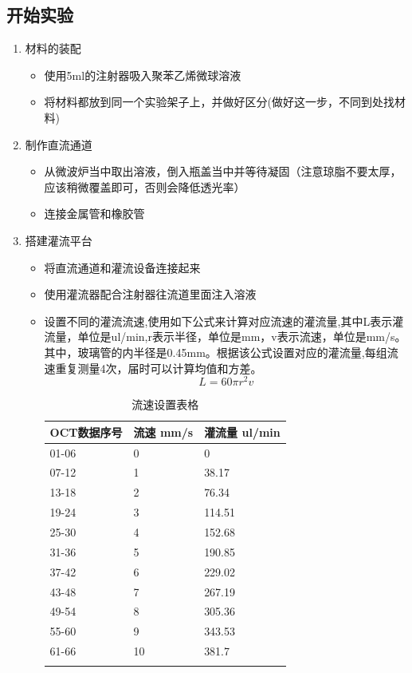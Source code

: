 \documentclass[12pt]{article}
\begin{document}
\subsection{开始实验}
\begin{enumerate}
    \item 材料的装配
    \begin{itemize}
        \item 使用5ml的注射器吸入聚苯乙烯微球溶液
        \item 将材料都放到同一个实验架子上，并做好区分(做好这一步，不同到处找材料)
    \end{itemize}

    \item 制作直流通道
    \begin{itemize}
        \item 从微波炉当中取出溶液，倒入瓶盖当中并等待凝固（注意琼脂不要太厚，应该稍微覆盖即可，否则会降低透光率）
        \item 连接金属管和橡胶管
    \end{itemize}

    \item 搭建灌流平台
    \begin{itemize}
        \item 将直流通道和灌流设备连接起来
        \item 使用灌流器配合注射器往流道里面注入溶液
        \item 设置不同的灌流流速,使用如下公式来计算对应流速的灌流量,其中L表示灌流量，单位是ul/min,r表示半径，单位是mm，v表示流速，单位是mm/s。其中，玻璃管的内半径是0.45mm。根据该公式设置对应的灌流量,每组流速重复测量4次，届时可以计算均值和方差。
        \begin{equation}
            L=60 \pi r^2 v
        \end{equation}

        \footnotesize
        \begin{longtable}{@{} p{5cm} p{5cm} p{5cm} @{}}
            \toprule
            \textbf{OCT数据序号} & \textbf{流速 mm/s} & \textbf{灌流量 ul/min} \\ 
            \midrule
            01-06& 0 & 0 \\
            07-12 & 1 & 38.17 \\
            13-18 & 2 & 76.34 \\
            19-24 & 3 & 114.51 \\
            25-30 & 4 & 152.68 \\
            31-36 & 5 & 190.85 \\
            37-42 & 6 & 229.02 \\
            43-48 & 7 & 267.19 \\
            49-54 & 8 & 305.36            \\
            55-60 & 9 & 343.53            \\
            61-66 & 10 & 381.7            \\
            \bottomrule
            \caption{流速设置表格} \\
        \end{longtable}
    \end{itemize}


\end{enumerate}
\end{document}
